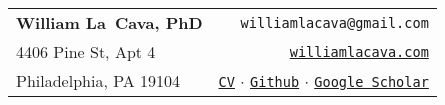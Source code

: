 \noindent \begin{tabularx}{\textwidth}{p{29em}r}
{\large \bf William La~Cava, PhD} 
& \texttt{williamlacava@gmail.com} \\
4406 Pine St, Apt 4  
& \href{http://williamlacava.com}{\texttt{williamlacava.com}} \\
Philadelphia, PA 19104
&
\href{http://williamlacava.com/files/la_cava_cv.pdf}{\texttt{CV}} 
$\cdot$
\href{https://github.com/lacava}{\texttt{Github}} 
$\cdot$
\href{https://scholar.google.com/citations?user=iZB7inEAAAAJ}{\texttt{Google Scholar}}\\
\hline
\end{tabularx}
